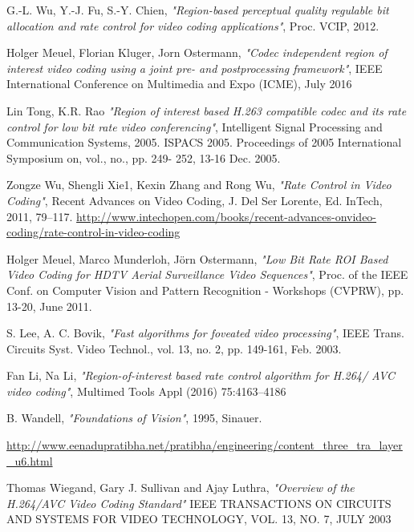\documentclass[11pt]{article} %
\begin{document}
\begin{thebibliography}{9}
G.-L. Wu, Y.-J. Fu, S.-Y. Chien, \textit{"Region-based perceptual quality regulable bit allocation and rate control for video coding applications"},
Proc. VCIP, 2012.

Holger Meuel, Florian Kluger, Jorn Ostermann, \textit{"Codec independent region of interest video coding using a joint pre- and postprocessing framework"}, 
IEEE International Conference on Multimedia and Expo (ICME), July 2016

Lin Tong, K.R. Rao \textit{"Region of interest based H.263 compatible codec and its rate control for low bit rate video conferencing"}, 
Intelligent Signal Processing and Communication Systems, 2005. ISPACS 2005. Proceedings of 2005 International Symposium on, vol., no., pp. 249- 252, 13-16 Dec. 2005.

Zongze Wu, Shengli Xie1, Kexin Zhang and Rong Wu, \textit{"Rate Control in Video Coding"},
Recent Advances on Video Coding, J. Del Ser Lorente, Ed. InTech,
2011, 79–117. \url{http://www.intechopen.com/books/recent-advances-onvideo-coding/rate-control-in-video-coding}

Holger Meuel, Marco Munderloh, Jörn Ostermann, \textit{"Low Bit Rate ROI Based Video Coding for HDTV Aerial Surveillance Video Sequences"}, 
Proc. of the IEEE Conf. on Computer Vision and Pattern Recognition - Workshops (CVPRW), pp. 13-20, June 2011.

S. Lee, A. C. Bovik, \textit{"Fast algorithms for foveated video processing"},
IEEE Trans. Circuits Syst. Video Technol., vol. 13, no. 2, pp. 149-161, Feb. 2003.

Fan Li, Na Li, \textit{"Region-of-interest based rate control algorithm for H.264/
AVC video coding"},
Multimed Tools Appl (2016) 75:4163–4186
 
B. Wandell, \textit{"Foundations of Vision"}, 1995, Sinauer.

\url{http://www.eenadupratibha.net/pratibha/engineering/content_three_tra_layer_u6.html}

Thomas Wiegand, Gary J. Sullivan and Ajay Luthra, \textit{"Overview of the H.264/AVC Video Coding Standard"}
IEEE TRANSACTIONS ON CIRCUITS AND SYSTEMS FOR VIDEO TECHNOLOGY, VOL. 13, NO. 7, JULY 2003

\end{thebibliography}
\end{document}
